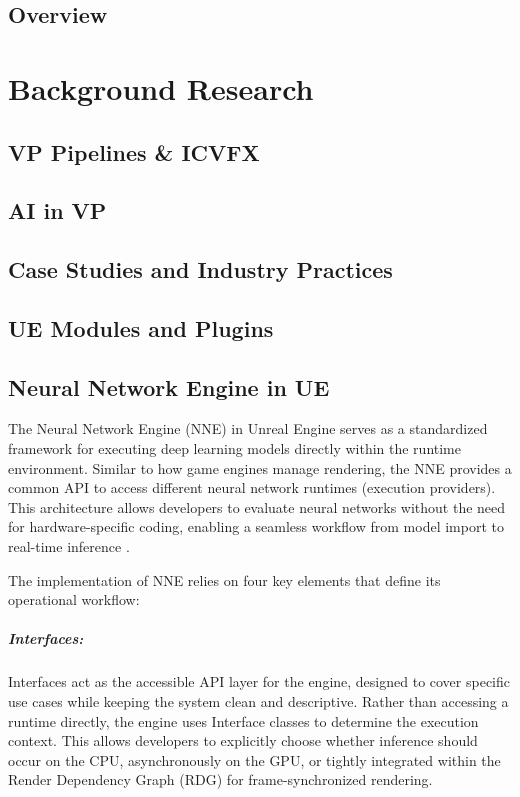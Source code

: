 \documentclass[12pt,a4paper]{report}
\begin{document}
\section{Overview}


\chapter{Background Research}

\section{VP Pipelines \& ICVFX}

\section{AI in VP}

\section{Case Studies and Industry Practices}

\section{UE Modules and Plugins}

\section{Neural Network Engine in UE}
The Neural Network Engine (NNE) in Unreal Engine serves as a standardized framework for executing deep learning models directly within the runtime environment. Similar to how game engines manage rendering, the NNE provides a common API to access different neural network runtimes (execution providers). This architecture allows developers to evaluate neural networks without the need for hardware-specific coding, enabling a seamless workflow from model import to real-time inference \cite{CT}.

The implementation of NNE relies on four key elements that define its operational workflow:

\paragraph{Interfaces:} Interfaces act as the accessible API layer for the engine, designed to cover specific use cases while keeping the system clean and descriptive. Rather than accessing a runtime directly, the engine uses Interface classes to determine the execution context. This allows developers to explicitly choose whether inference should occur on the CPU, asynchronously on the GPU, or tightly integrated within the Render Dependency Graph (RDG) for frame-synchronized rendering.
\end{document}
